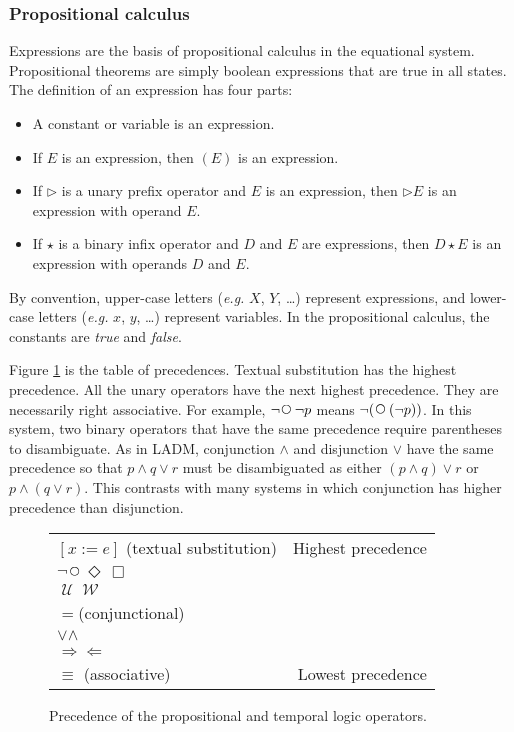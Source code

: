 \documentclass[12pt, fleqn, leqno]{article}
\newcommand{\impl}{\ensuremath{\Rightarrow}}        %
\newcommand{\foll}{\ensuremath{\Leftarrow}}         %
\newcommand{\Until}{\;\mathcal{U}\;}
\newcommand{\Wait}{\;\mathcal{W}\;}
\newcommand{\Next}{\;\,\text{\raisebox{3.5pt}{\circle{6}}}}
\newcommand{\Event}{\Diamond\,}
\newcommand{\Always}{\Box\,}
\begin{document}
\subsubsection{Propositional calculus}

Expressions are the basis of propositional calculus in the equational system.
Propositional theorems are simply boolean expressions that are true in all states.
The definition of an expression has four parts:
\begin{itemize}[$\bullet$]
\item A constant or variable is an expression.
\item If $E$ is an expression, then $(E)$ is an expression.
\item If $\triangleright$ is a unary prefix operator and $E$ is an expression, then $\triangleright E$ is an expression with operand $E$.
\item If $\star$ is a binary infix operator and $D$ and $E$ are expressions, then $D \star E$ is an expression with operands $D$
and $E$.
\end{itemize}
By convention, upper-case letters ({\itshape e.g.\/} $X$, $Y$, \dots) represent expressions,
and lower-case letters ({\itshape e.g.\/} $x$, $y$, \dots) represent variables.
In the propositional calculus, the constants are {\itshape true\/} and {\itshape false\/}.

Figure \ref{precedence-table} is the table of precedences.
Textual substitution has the highest precedence.
All the unary operators have the next highest precedence.
They are necessarily right associative.
For example, $\neg \Next \neg p$ means $\neg (\Next (\neg p))$.
In this system, two binary operators that have the same precedence require parentheses to disambiguate.
As in LADM, conjunction $\land$ and disjunction $\lor$ have the same precedence so that $p\land q\lor r$
must be disambiguated as either $(p\land q)\lor r$ or $p\land (q\lor r)$.
This contrasts with many systems in which conjunction has higher precedence than disjunction.

\begin{figure}[t]
\centering
\setlength\extrarowheight{2pt}
\begin{tabular}{lr}
\hline
$[x := e]$ (textual substitution) & Highest precedence\\
$\neg$\quad $\Next$\quad $\Event$\quad $\Always$ &\\
$\Until$\quad $\Wait$ &\\
$=$\quad (conjunctional) &\\
$\lor$\quad $\land$ &\\
$\impl$\quad $\foll$ &\\
$\equiv$ \quad (associative) & Lowest precedence\\
\hline
\end{tabular}
\caption{Precedence of the propositional and temporal logic operators.
\label{precedence-table}}
\end{figure}
\end{document}
